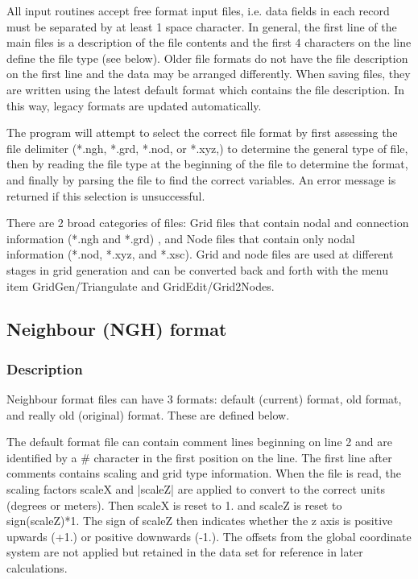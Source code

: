 \documentclass{article}
\begin{document}
All input routines accept free format input files, i.e. data fields in each record must be separated by at least 1 space character.
In general, the first line of the main files is a description of the file contents and the first 4 characters
on the line define the file type (see below). Older file formats do not have the file description on the first line and the data
may be arranged differently. When saving files, they are written using the latest default format which contains
the file description. In this way, legacy formats are updated automatically.

The program will attempt to select the correct file format by first assessing the file delimiter (*.ngh, *.grd, *.nod, or *.xyz,)
to determine the general type of file, then
by reading the file type at the beginning of the file to determine the format, and finally by parsing the file to find the correct variables. An error message is returned if this selection is unsuccessful.

There are 2 broad categories of files: Grid files that contain nodal and connection information (*.ngh and *.grd)
, and Node files that contain only nodal information (*.nod, *.xyz, and *.xsc). Grid and node files are used at different 
stages in grid generation and can be converted back and forth with the menu item GridGen/Triangulate and
GridEdit/Grid2Nodes.

\newpage
\subsection[Neighbour (NGH) format]{Neighbour (NGH) format}

\subsubsection[Description]{Description}

Neighbour format files can have 3 formats: default (current) format, old format, and really old (original) format.
These are defined below.

The default format file can contain comment lines beginning on line 2 and are identified by a \# character in the
first position on the line. The first line after comments contains scaling and grid type information. When the file is read,
the scaling factors scaleX and |scaleZ| are applied to convert to the correct units (degrees or meters). Then scaleX
is reset to 1. and scaleZ is reset to sign(scaleZ)*1. The sign of scaleZ then indicates whether the z axis is positive
upwards (+1.) or positive downwards (-1.). The offsets from
the global coordinate system are not applied but retained in the data set for reference in later calculations.
\end{document}
